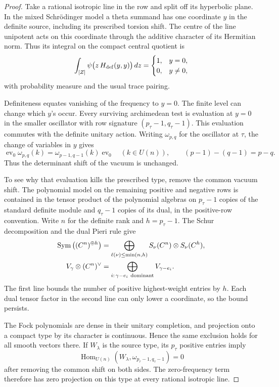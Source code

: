 \begin{proof}
Take a rational isotropic line in the row and split off its hyperbolic
plane. In the mixed Schr\"odinger model a theta summand has one
coordinate \(y\) in the definite source, including its prescribed
torsion shift. The centre of the line unipotent acts on this
coordinate through the additive character of its Hermitian norm.
Thus its integral on the compact central quotient is
\[
 \int_{[Z]}\psi\bigl(z\,H_{\rm def}(y,y)\bigr)\,dz
  =\begin{cases}1,&y=0,\\0,&y\ne0,\end{cases}
\]
with probability measure and the usual trace pairing.

Definiteness
equates vanishing of the frequency to \(y=0\). The finite level
can change which \(y\)'s occur. Every surviving archimedean
test is evaluation at \(y=0\) in the smaller oscillator with row
signature \((p_\tau-1,q_\tau-1)\). This evaluation commutes with
the definite unitary action. Writing \(\omega_{p,q}\) for the
oscillator at \(\tau\), the change of variables in \(y\) gives
\[
  \operatorname{ev}_0\omega_{p,q}(k)
       =\omega_{p-1,q-1}(k)\operatorname{ev}_0
          \quad(k\in U(n)),\qquad
          (p-1)-(q-1)=p-q .
\]
Thus the determinant shift of the vacuum is unchanged.

To see why that evaluation kills the prescribed type, remove the
common vacuum shift. The polynomial model on the remaining positive
and negative rows is contained in the tensor product of the
polynomial algebras on \(p_\tau-1\) copies of the standard definite
module and \(q_\tau-1\) copies of its dual, in the positive-row
convention. Write \(n\) for the definite rank and \(h=p_\tau-1\). The
Schur decomposition and the dual Pieri rule give
\begin{align*}
 \operatorname{Sym}\big((\mathbb C^n)^{\oplus h}\big)
   &=\bigoplus_{\ell(\nu)\le\min(n,h)}
           \mathbb S_\nu(\mathbb C^n)\otimes\mathbb S_\nu(\mathbb C^h),\\
 V_\gamma\otimes (\mathbb C^n)^\vee
   &=\bigoplus_{i:\,\gamma-e_i\ {\rm dominant}} V_{\gamma-e_i}.
\end{align*}
The first line bounds the number of positive highest-weight
entries by \(h\). Each dual tensor factor in the second line
can only lower a coordinate, so the bound persists.

The Fock polynomials are dense in their unitary completion, and
projection onto a compact type by its character is continuous.
Hence the same exclusion holds for all smooth vectors there. If \(W_\lambda\) is the source type, its \(p_\tau\) positive
entries imply
\[
 \operatorname{Hom}_{U(n)}
      (W_\lambda,\omega_{p_\tau-1,q_\tau-1})=0
\]
after removing the common shift on both sides. The zero-frequency
term therefore has zero projection on this type at every rational
isotropic line.


\end{proof}
